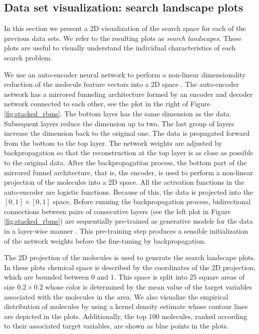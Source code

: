 \subsection{Data set visualization: search landscape plots}

In this section we present a 2D visualization of the search space for each of
the previous data sets. We refer to the resulting plots as \emph{search
landscapes}. These plots are useful to visually understand the individual
characteristics of each search problem. 

We use an
auto-encoder neural network to perform a non-linear dimensionality reduction of the molecule feature vectors
into a 2D space \cite{Hinton_2006}. The auto-encoder network has a mirrored
funneling architecture formed by an encoder and decoder network connected to
each other, see the plot in the
right of Figure \ref{fig:stacked_rbms}. The bottom layer has the same dimension as the data. Subsequent
layers reduce the dimension up to two. The last group of layers
increase the dimension back to the original one. 
The data is propagated forward from the bottom to the top layer. The network
weights are adjusted by backpropagation so that the reconstruction at the top
layer is as close as possible to the original data. After
the backpropagation process, the bottom part of the mirrored funnel architecture, that is, the
encoder, is used to perform a non-linear projection of the molecules into a 2D
space. All the activation functions in the auto-encoder are logistic functions. Because of this, the data is projected into the $[0,1]\times[0,1]$ space. Before running the backpropagation process, bidirectional
connections between pairs of consecutive layers (see the left plot in Figure
\ref{fig:stacked_rbms}) are sequentially pre-trained as
generative models for the data in a layer-wise manner \cite{Hinton_2006}. This pre-training step
produces a sensible initialization of the network weights before the fine-tuning by backpropagation.

The 2D projection of the molecules is used to generate the search
landscape plots. In these plots chemical space is described by the coordinates of the 2D projection,
which are bounded between 0 and 1. This space is split into 25 square areas of size $0.2 \times 0.2$ whose 
color is determined by the mean value of the target variables associated with the molecules in the area. We also visualize the empirical distribution of molecules by using a kernel density estimate whose contour lines are depicted in the plots. Additionally, the top 100 molecules, ranked
according to their associated target variables, are shown as blue points in the plots.  


